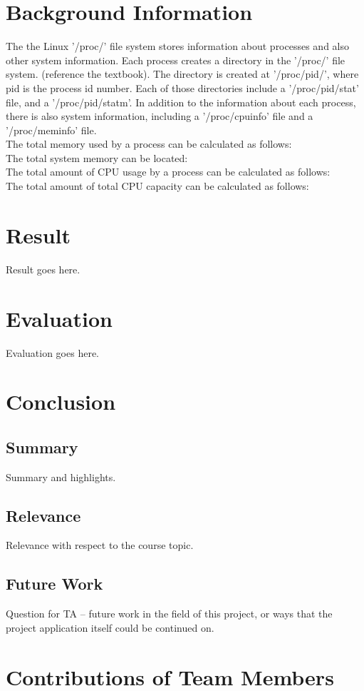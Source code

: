 \documentclass[12pt]{article}
\begin{document}
	\section{Background Information}
	The the Linux '/proc/' file system stores information about processes and also other system information. Each process creates a directory in the '/proc/' file system. (reference the textbook). The directory is created at '/proc/pid/', where pid is the process id number. Each of those directories include a '/proc/pid/stat' file, and a '/proc/pid/statm'. In addition to the information about each process, there is also system information, including a '/proc/cpuinfo' file and a '/proc/meminfo' file.\\
	The total memory used by a process can be calculated as follows:\\
	The total system memory can be located:\\
	The total amount of CPU usage by a process can be calculated as follows:\\
	The total amount of total CPU capacity can be calculated as follows:\\
	
	\section{Result}
	Result goes here.
	
	\section{Evaluation}
	Evaluation goes here.
	
	\section{Conclusion}
	
	\subsection{Summary}
	Summary and highlights.
	
	\subsection{Relevance}
	Relevance with respect to the course topic.
	
	\subsection{Future Work}
	Question for TA -- future work in the field of this project, or ways that the project application itself could be continued on.
	
	
	\setcounter{secnumdepth}{0}
	\section{Contributions of Team Members}
	
	\begin{thebibliography}{3}
	\end{thebibliography}{}
\end{document}
